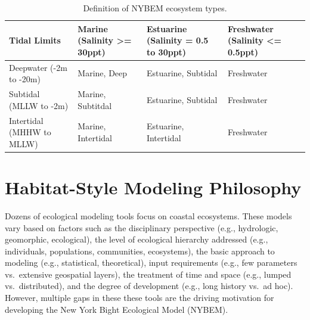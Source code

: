 \documentclass[
]{book}
\begin{document}
\begin{table}

\caption{\label{tab:unnamed-chunk-5}Definition of NYBEM ecosystem types.}
\centering
\begin{tabu} to 
\hline
Tidal Limits & Marine (Salinity >= 30ppt) & Estuarine (Salinity = 0.5 to 30ppt) & Freshwater (Salinity <= 0.5ppt)\\
\hline
Deepwater (-2m to -20m) & Marine, Deep & Estuarine, Subtidal & Freshwater\\
\hline
Subtidal (MLLW to -2m) & Marine, Subtitdal & Estuarine, Subtidal & Freshwater\\
\hline
Intertidal (MHHW to MLLW) & Marine, Intertidal & Estuarine, Intertidal & Freshwater\\
\hline
\end{tabu}
\end{table}

\hypertarget{habitat-style-modeling-philosophy}{%
\section{Habitat-Style Modeling Philosophy}\label{habitat-style-modeling-philosophy}}

Dozens of ecological modeling tools focus on coastal ecosystems. These models vary based on factors such as the disciplinary perspective (e.g., hydrologic, geomorphic, ecological), the level of ecological hierarchy addressed (e.g., individuals, populations, communities, ecosystems), the basic approach to modeling (e.g., statistical, theoretical), input requirements (e.g., few parameters vs.~extensive geospatial layers), the treatment of time and space (e.g., lumped vs.~distributed), and the degree of development (e.g., long history vs.~ad hoc). However, multiple gaps in these these tools are the driving motivation for developing the New York Bight Ecological Model (NYBEM).
\end{document}
